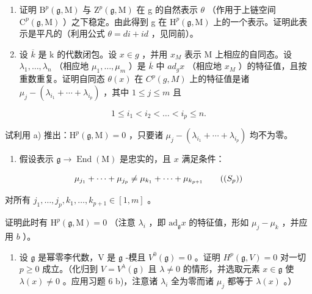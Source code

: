 \begin{enumerate}
\def\labelenumi{\alph{enumi})}
\item
  证明 \(\mathrm{B}^{p}(\mathfrak{g},\mathrm{M})\) 与 \(\mathrm{Z}^{p}(\mathfrak{g},\mathrm{M})\) 在 g 的自然表示 \(\theta\) （作用于上链空间 \(\mathrm{C}^{p}(\mathfrak{g},\mathrm{M})\) ）之下稳定。由此得到 g 在 \(\mathrm{H}^{p}(\mathfrak{g},\mathrm{M})\) 上的一个表示。证明此表示是平凡的（利用公式 \(\theta = di + id\) ，见同前）。
\item
  设 \(\overline{k}\) 是 k 的代数闭包。设 \(x \in g\) ，并用 \(x_{M}\) 表示 M 上相应的自同态。设 \(\lambda_{1}, \ldots, \lambda_{n}\) （相应地 \(\mu_{1}, \ldots, \mu_{m}\) ）是 \(\overline{k}\) 中 \(ad_{g}x\) （相应地 \(x_{M}\) ）的特征值，且按重数重复。证明自同态 \(\theta(x)\) 在 \(C^{p}(g, M)\) 上的特征值是诸 \(\mu_{j} - (\lambda_{i_{1}} + \cdots + \lambda_{i_{p}})\) ，其中 \(1 \leq j \leq m\) 且
\end{enumerate}

\[
1 \leq i _ {1} <   i _ {2} <   \dots <   i _ {p} \leq n.
\]

试利用 a) 推出：\(\mathrm{H}^{p}(\mathfrak{g},\mathrm{M})=0\) ，只要诸 \(\mu_{j}-(\lambda_{i_{1}}+\cdots+\lambda_{i_{p}})\) 均不为零。

\begin{enumerate}
\def\labelenumi{\alph{enumi})}
\setcounter{enumi}{2}
\tightlist
\item
  假设表示 \(\mathfrak{g} \to \operatorname{End}(\mathrm{M})\) 是忠实的，且 \(x\) 满足条件：
\end{enumerate}

\[
\mu_ {j _ {1}} + \dots + \mu_ {j _ {p}} \neq \mu_ {k _ {1}} + \dots + \mu_ {k _ {p + 1}}\tag{($S_{p}$)}
\]

对所有 \(j_{1},\ldots,j_{p},k_{1},\ldots,k_{p+1}\in[1,m]\) 。

证明此时有 \(\mathrm{H}^p (\mathfrak{g},\mathrm{M}) = 0\) （注意 \(\lambda_{i}\) ，即 \(\mathrm{ad}_{\mathfrak{g}}x\) 的特征值，形如 \(\mu_j - \mu_k\) ，并应用 \(b\) ）。

\begin{enumerate}
\def\labelenumi{\arabic{enumi})}
\setcounter{enumi}{6}
\tightlist
\item
  设 \(\mathfrak{g}\) 是幂零李代数，V 是 \(\mathfrak{g}\) -模且 \(V^0(\mathfrak{g}) = 0\) 。证明 \(H^p(\mathfrak{g}, V) = 0\) 对一切 \(p \geq 0\) 成立。（化归到 \(V = V^\lambda(\mathfrak{g})\) 且 \(\lambda \neq 0\) 的情形，并选取元素 \(x \in \mathfrak{g}\) 使 \(\lambda(x) \neq 0\) 。应用习题 6 b)，注意诸 \(\lambda_i\) 全为零而诸 \(\mu_j\) 都等于 \(\lambda(x)\) 。）
\end{enumerate}

